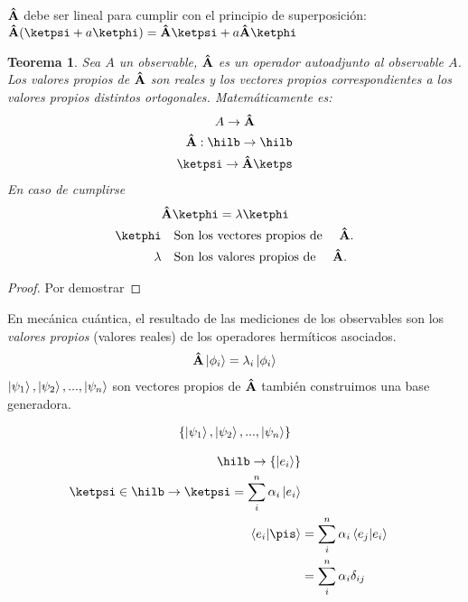          $\vu{A}$ debe ser lineal para cumplir con el principio de superposición:\\
         $\vu{A}(\ketpsi+a\ketphi)=\vu{A}\ketpsi+a\vu{A}\ketphi$

         \newtheorem{theorem}{Teorema}
         \begin{theorem}
             Sea $A$ un observable, $\vu{A}$ es un operador autoadjunto  al observable $A$. Los valores propios de $\vu{A}$ son reales y los vectores propios correspondientes a los valores propios distintos ortogonales. Matemáticamente es:
             $$
                 A\rightarrow\vu{A}
             $$
             \begin{align*}
                 \vu{A}:\hilb\then\hilb \\
                 \ketpsi\then\vu{A}\ketps
             \end{align*}
             En caso de cumplirse
             \begin{align*}
                         & \vu{A}\ketphi=\lambda\ketphi             \\
                 \ketphi & \qq{Son los vectores propios de }\vu{A}. \\
                 \lambda & \qq{Son los valores propios de }\vu{A}.  \\
             \end{align*}

         \end{theorem}

         \begin{proof}
             Por demostrar
         \end{proof}

         En mecánica cuántica, el resultado de las mediciones de los observables son los \textit{valores propios} (valores reales) de los operadores hermíticos asociados.
         \begin{align*}
             \vu{A}\ket{\phi_i}=\lambda_i\ket{\phi_i}
         \end{align*}
         $\ket{\psi_1},\ket{\psi_2},...,\ket{\psi_n}$ son vectores propios de $\vu{A}$ también construimos una base generadora.

         \begin{align*}
             \{\ket{\psi_1},\ket{\psi_2},...,\ket{\psi_n}\}
         \end{align*}

         \begin{align*}
             \hilb\then\{\ket{e_i}\}                                 \\
             \ketpsi\in\hilb\then\ketpsi=\sum_i^n\alpha_i\ket{e_i}   \\
             \braket{e_i}{\pis} & =\sum_i^n\alpha_i\braket{e_j}{e_i} \\
                                & =\sum_i^n\alpha_i\delta_{ij}
         \end{align*}

